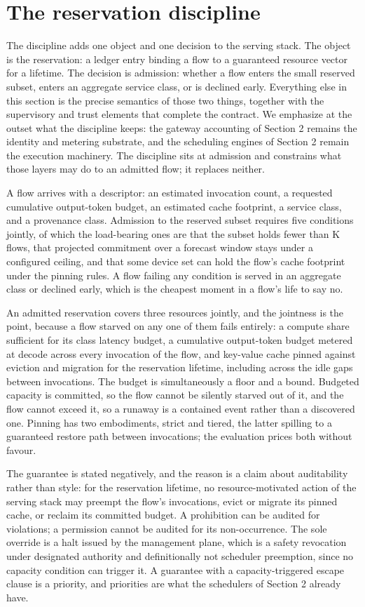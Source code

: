 \section{The reservation discipline}

The discipline adds one object and one decision to the serving stack. The
object is the reservation: a ledger entry binding a flow to a guaranteed
resource vector for a lifetime. The decision is admission: whether a flow
enters the small reserved subset, enters an aggregate service class, or is
declined early. Everything else in this section is the precise semantics
of those two things, together with the supervisory and trust elements that
complete the contract. We emphasize at the outset what the discipline
keeps: the gateway accounting of Section 2 remains the identity and
metering substrate, and the scheduling engines of Section 2 remain the
execution machinery. The discipline sits at admission and constrains what
those layers may do to an admitted flow; it replaces neither.

A flow arrives with a descriptor: an estimated invocation count, a
requested cumulative output-token budget, an estimated cache footprint, a
service class, and a provenance class. Admission to the reserved subset
requires five conditions jointly, of which the load-bearing ones are that
the subset holds fewer than K flows, that projected commitment over a
forecast window stays under a configured ceiling, and that some device
set can hold the flow's cache footprint under the pinning rules. A flow
failing any condition is served in an aggregate class or declined early,
which is the cheapest moment in a flow's life to say no.

An admitted reservation covers three resources jointly, and the jointness
is the point, because a flow starved on any one of them fails entirely: a
compute share sufficient for its class latency budget, a cumulative
output-token budget metered at decode across every invocation of the
flow, and key-value cache pinned against eviction and migration for the
reservation lifetime, including across the idle gaps between invocations.
The budget is simultaneously a floor and a bound. Budgeted capacity is
committed, so the flow cannot be silently starved out of it, and the flow
cannot exceed it, so a runaway is a contained event rather than a
discovered one. Pinning has two embodiments, strict and tiered, the
latter spilling to a guaranteed restore path between invocations; the
evaluation prices both without favour.

The guarantee is stated negatively, and the reason is a claim about
auditability rather than style: for the reservation lifetime, no
resource-motivated action of the serving stack may preempt the flow's
invocations, evict or migrate its pinned cache, or reclaim its committed
budget. A prohibition can be audited for violations; a permission cannot
be audited for its non-occurrence. The sole override is a halt issued by
the management plane, which is a safety revocation under designated
authority and definitionally not scheduler preemption, since no capacity
condition can trigger it. A guarantee with a capacity-triggered escape
clause is a priority, and priorities are what the schedulers of Section 2
already have.

